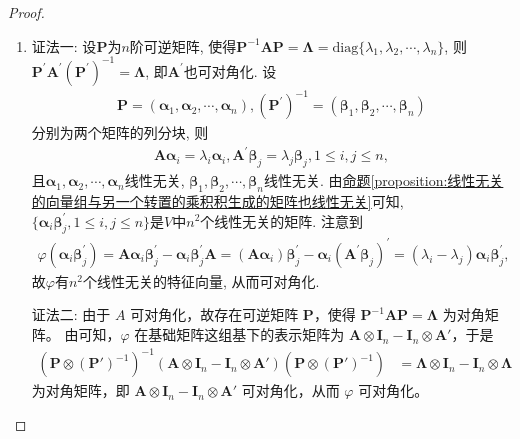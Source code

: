 \documentclass[../../main.tex]{subfiles}
\begin{document}
\begin{proof}
\begin{enumerate}
\item {\color{blue}证法一:}
设\(\boldsymbol{P}\)为\(n\)阶可逆矩阵, 使得\(\boldsymbol{P}^{-1}\boldsymbol{AP}=\boldsymbol{\Lambda}=\mathrm{diag}\{\lambda_{1},\lambda_{2},\cdots,\lambda_{n}\}\), 则\(\boldsymbol{P}^{\prime}\boldsymbol{A}^{\prime}(\boldsymbol{P}^{\prime})^{-1}=\boldsymbol{\Lambda}\), 即\(\boldsymbol{A}^{\prime}\)也可对角化. 设
\begin{align*}
\boldsymbol{P}=(\boldsymbol{\alpha}_{1},\boldsymbol{\alpha}_{2},\cdots,\boldsymbol{\alpha}_{n}), (\boldsymbol{P}^{\prime})^{-1}=(\boldsymbol{\beta}_{1},\boldsymbol{\beta}_{2},\cdots,\boldsymbol{\beta}_{n})
\end{align*}
分别为两个矩阵的列分块, 则
\begin{align*}
\boldsymbol{A}\boldsymbol{\alpha}_{i}=\lambda_{i}\boldsymbol{\alpha}_{i}, \boldsymbol{A}^{\prime}\boldsymbol{\beta}_{j}=\lambda_{j}\boldsymbol{\beta}_{j}, 1\leq i,j\leq n,
\end{align*}
且\(\boldsymbol{\alpha}_{1},\boldsymbol{\alpha}_{2},\cdots,\boldsymbol{\alpha}_{n}\)线性无关, \(\boldsymbol{\beta}_{1},\boldsymbol{\beta}_{2},\cdots,\boldsymbol{\beta}_{n}\)线性无关. 由\hyperref[proposition:线性无关的向量组与另一个转置的乘积积生成的矩阵也线性无关]{命题\ref{proposition:线性无关的向量组与另一个转置的乘积积生成的矩阵也线性无关}}可知, \(\{\boldsymbol{\alpha}_{i}\boldsymbol{\beta}_{j}^{\prime},1\leq i,j\leq n\}\)是\(V\)中\(n^{2}\)个线性无关的矩阵. 注意到
\begin{align*}
\varphi(\boldsymbol{\alpha}_{i}\boldsymbol{\beta}_{j}^{\prime})=\boldsymbol{A}\boldsymbol{\alpha}_{i}\boldsymbol{\beta}_{j}^{\prime}-\boldsymbol{\alpha}_{i}\boldsymbol{\beta}_{j}^{\prime}\boldsymbol{A}=(\boldsymbol{A}\boldsymbol{\alpha}_{i})\boldsymbol{\beta}_{j}^{\prime}-\boldsymbol{\alpha}_{i}(\boldsymbol{A}^{\prime}\boldsymbol{\beta}_{j})^{\prime}=(\lambda_{i}-\lambda_{j})\boldsymbol{\alpha}_{i}\boldsymbol{\beta}_{j}^{\prime},
\end{align*}
故\(\varphi\)有\(n^{2}\)个线性无关的特征向量, 从而可对角化.

{\color{blue}证法二:}
由于 $A$ 可对角化，故存在可逆矩阵 $\boldsymbol{P}$，使得 $\boldsymbol{P}^{-1}\boldsymbol{AP} = \boldsymbol{\Lambda}$ 为对角矩阵。
由可知，$\varphi$ 在基础矩阵这组基下的表示矩阵为 $\boldsymbol{A} \otimes \boldsymbol{I}_n - \boldsymbol{I}_n \otimes \boldsymbol{A}'$，于是
\begin{align*}
(\boldsymbol{P} \otimes (\boldsymbol{P}')^{-1})^{-1}(\boldsymbol{A} \otimes \boldsymbol{I}_n - \boldsymbol{I}_n \otimes \boldsymbol{A}')(\boldsymbol{P} \otimes (\boldsymbol{P}')^{-1}) 
&= \boldsymbol{\Lambda} \otimes \boldsymbol{I}_n - \boldsymbol{I}_n \otimes \boldsymbol{\Lambda}
\end{align*}
为对角矩阵，即 $\boldsymbol{A} \otimes \boldsymbol{I}_n - \boldsymbol{I}_n \otimes \boldsymbol{A}'$ 可对角化，从而 $\varphi$ 可对角化。


\end{enumerate}
\end{proof}
\end{document}
